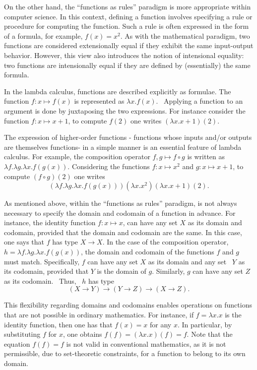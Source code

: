 On the other hand, the “functions as rules” paradigm is more appropriate within computer science. In this context, defining a function involves specifying a rule or procedure for computing the function. Such a rule is often expressed in the form of a formula, for example, \( f(x) = x^2 \). As with the mathematical paradigm, two functions are considered extensionally equal if they exhibit the same input-output behavior. However, this view also introduces the notion of intensional equality: two functions are intensionally equal if they are defined by (essentially) the same formula.


In the lambda calculus, functions are described explicitly as formulae. The function $f:x \mapsto f(x)$ is represented as $\lambda x.f(x)$.  Applying a function to an argument is done by juxtaposing the two expressions. For instance consider the function $f:x \mapsto x+1$, to compute $f(2)$ one writes $(\lambda x.x+1)(2)$.

The expression of higher‑order functions - functions whose inputs and/or outputs are themselves functions- in a simple manner is an essential feature of lambda calculus. For example, the composition operator $f,g \mapsto f \circ g$ is written as $\lambda f. \lambda g. \lambda x. f(g(x))$. Considering the functions $f:x \mapsto x^2$ and $g:x \mapsto x+1$, to compute $(f \circ g)(2)$ one writes $$(\lambda f. \lambda g. \lambda x. f(g(x)))(\lambda x.x^2)(\lambda x.x+1)(2).$$

As mentioned above,  within  the “functions as rules” paradigm, is not
always necessary to specify the domain and codomain of a function in advance. For instance, the identity function $f: x \mapsto x$, can have any set $X$ as its domain and codomain, provided that the domain and codomain are the same. In this case, one says that $f$ has type $X \rightarrow{} X$. In the case of the composition operator, $h=\lambda f. \lambda g. \lambda x. f(g(x))$, the domain and codomain of the functions $f$ and $g$ must match. Specifically, $f$ can have any set $X$ as its domain and any set  $Y$ as its codomain, provided that $Y$ is the domain of $g$. Similarly, $g$ can have any set $Z$ as its codomain.  Thus,  $h$ has type $$(X \rightarrow{} Y) \rightarrow{} (Y \rightarrow{} Z) \rightarrow{} (X \rightarrow{} Z).$$ 

This flexibility regarding domains and codomains enables operations on functions that are not possible in ordinary mathematics. For instance, if $f = \lambda x.x$ is the identity function, then one has that $f(x) = x$ for any $x$. In particular, by substituting $f$ for $x$, one obtains $f(f) = (\lambda x.x)(f) = f$. Note that the equation $f(f) = f$ is not valid in conventional mathematics, as it is not permissible, due to set-theoretic constraints, for a function to belong to its own domain.

